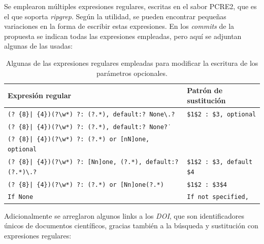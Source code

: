 Se emplearon múltiples expresiones regulares, escritas en el sabor PCRE2, que es el que soporta \textit{ripgrep}. Según la utilidad, se pueden encontrar pequeñas variaciones en la forma de escribir estas expresiones. En los \textit{commits} de la propuesta se indican todas las expresiones empleadas, pero aquí se adjuntan algunas de las usadas:

\begin{table}[H]
    \centering
    \begin{adjustbox}{max width=\textwidth}
        \begin{tabular}{l|l}
            Expresión regular                                                                                       & Patrón de sustitución              \\
            \hline
            \texttt{(? \{8\}| \{4\})(?\textbackslash{}w*) ?: (?.*), default:? None\textbackslash{}.?}               & \texttt{\$1\$2 : \$3, optional}    \\
            \texttt{(? \{8\}| \{4\})(?\textbackslash{}w*) ?: (?.*), default:? None\.?}                              &                                    \\
            \texttt{(? \{8\}| \{4\})(?\textbackslash{}w*) ?: (?.*) or {[}nN{]}one, optional}                        &                                    \\
            \hline
            \texttt{(? \{8\}| \{4\})(?\textbackslash{}w*) ?: {[}Nn{]}one, (?.*), default:? (?.*)\textbackslash{}.?} & \texttt{\$1\$2 : \$3, default \$4} \\
            \hline
            \texttt{(? \{8\}| \{4\})(?\textbackslash{}w*) ?: (?.*) or {[}Nn{]}one(?.*)}                             & \texttt{\$1\$2 : \$3\$4}           \\
            \hline
            \texttt{If None}                                                                                        & \texttt{If not specified,}         \\
        \end{tabular}
    \end{adjustbox}
    \caption{Algunas de las expresiones regulares empleadas para modificar la escritura de los parámetros opcionales.}
    \label{tab:expresiones_regulares_default_none}
\end{table}

Adicionalmente se arreglaron algunos links a los \textit{DOI}, que son identificadores únicos de documentos científicos, gracias también a la búsqueda y sustitución con expresiones regulares:

